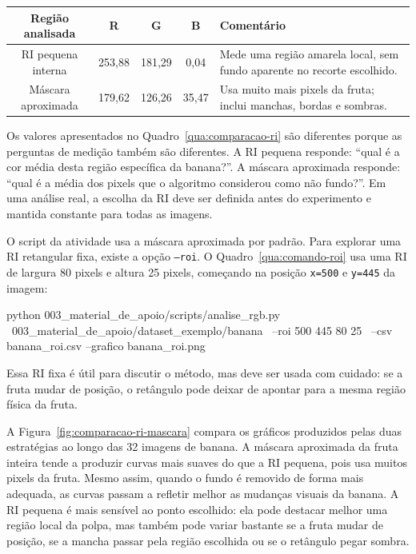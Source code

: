 \documentclass[12pt]{article}
\newcounter{quadro}
\begin{document}
\label{qua:comparacao-ri}
\begin{cmdbox}
\begin{tabularx}{\linewidth}{@{}C C C C >{\raggedright\arraybackslash}X@{}}
\toprule
\textbf{Região analisada} & \textbf{R} & \textbf{G} & \textbf{B} & \textbf{Comentário} \\
\midrule
RI pequena interna & 253,88 & 181,29 & 0,04 & Mede uma região amarela local, sem fundo aparente no recorte escolhido. \\
Máscara aproximada & 179,62 & 126,26 & 35,47 & Usa muito mais pixels da fruta; inclui manchas, bordas e sombras. \\
\bottomrule
\end{tabularx}
\end{cmdbox}

Os valores apresentados no Quadro~\ref{qua:comparacao-ri} são diferentes porque as perguntas de medição também são diferentes. A RI pequena responde: ``qual é a cor média desta região específica da banana?''. A máscara aproximada responde: ``qual é a média dos pixels que o algoritmo considerou como não fundo?''. Em uma análise real, a escolha da RI deve ser definida antes do experimento e mantida constante para todas as imagens.

O script da atividade usa a máscara aproximada por padrão. Para explorar uma RI retangular fixa, existe a opção \texttt{--roi}. O Quadro~\ref{qua:comando-roi} usa uma RI de largura 80 pixels e altura 25 pixels, começando na posição \texttt{x=500} e \texttt{y=445} da imagem:

\label{qua:comando-roi}
\begin{codebox}
python 003_material_de_apoio/scripts/analise_rgb.py \
003_material_de_apoio/dataset_exemplo/banana \
--roi 500 445 80 25 \
--csv banana_roi.csv --grafico banana_roi.png
\end{codebox}

Essa RI fixa é útil para discutir o método, mas deve ser usada com cuidado: se a fruta mudar de posição, o retângulo pode deixar de apontar para a mesma região física da fruta.

A Figura~\ref{fig:comparacao-ri-mascara} compara os gráficos produzidos pelas duas estratégias ao longo das 32 imagens de banana. A máscara aproximada da fruta inteira tende a produzir curvas mais suaves do que a RI pequena, pois usa muitos pixels da fruta. Mesmo assim, quando o fundo é removido de forma mais adequada, as curvas passam a refletir melhor as mudanças visuais da banana. A RI pequena é mais sensível ao ponto escolhido: ela pode destacar melhor uma região local da polpa, mas também pode variar bastante se a fruta mudar de posição, se a mancha passar pela região escolhida ou se o retângulo pegar sombra.
\end{document}
